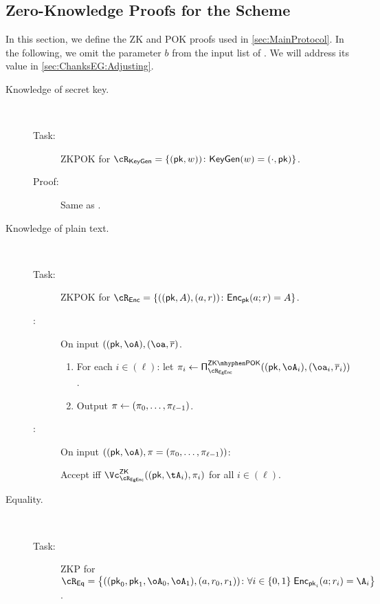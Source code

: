 \subsection{Zero-Knowledge  Proofs for the Scheme }\label{sec:ChanksEG:Proofs}
In this section, we define the ZK and POK proofs used in  \cref{sec:MainProtocol}.
In the following, we omit the parameter $b$ from the input list of  \Dec.  We will address its value in \cref{sec:ChanksEG:Adjusting}.


\begin{description}
	\item[Knowledge of secret key.] ~
	
	\begin{description}
		\item[Task:] ZKPOK for $\rKeyGen=\rKeyGenDef$.
		
		\item[Proof:] Same as \piZKPOK{\rEgKeyGen}. 
		
	\end{description}
	
	
	\item[Knowledge of plain text.] ~
	
	

	\begin{description}
		\item[Task:] ZKPOK for $\rEnc=\rEncDef$.
		
		\item[\Pc:] On  input  $((\pk,\oA),(\oa,\orr)$.
		\begin{enumerate}
			\item For each $i\in (\ell)$: let  $\pi_i \asn \piZKPOK{\rEGEnc}((\pk,\oA_i),(\oa_i,\orr_i))$. 
			
			\item Output $\pi \leftarrow (\pi_0,\ldots, \pi_{\ell-1})$.
			
		\end{enumerate}
		
		
	\item[\Vc:] On  input  $((\pk,\oA),\pi = (\pi_0,\ldots, \pi_{\ell-1}))$:
	
	 Accept iff  $\vZK{\rEGEnc}((\pk,\tA_i), \pi_i)$ for all $i\in (\ell)$.
		
	\end{description}
	
\item[Equality.]~ 


\begin{description}
	\item[Task:] ZKP for $\rEq =\rEqDef$.
	

\end{description}
\end{description}
